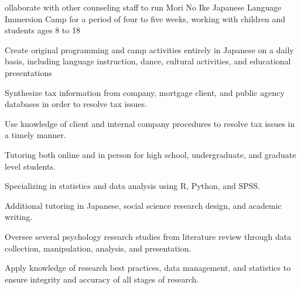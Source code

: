 \documentclass[letterpaper]{deedy-resume_sm} %
\begin{document}
\vspace{\topsep} %
\begin{tightitemize}
\item ollaborate with other counseling staff to run Mori No Ike Japanese Language Immersion Camp for a period of four to five weeks, working with children and students ages 8 to 18
\item Create original programming and camp activities entirely in Japanese on a daily basis, including language instruction, dance, cultural activities, and educational presentations
\end{tightitemize}
\vspace{\topsep} %
\begin{tightitemize}
\item Synthesize tax information from company, mortgage client, and public agency databases in order to resolve tax issues.
\item Use knowledge of client and internal company procedures to resolve tax issues in a timely manner.
\end{tightitemize}
\sectionspace %
\vspace{\topsep} %
\begin{tightitemize}
\item Tutoring both online and in person for high school, undergraduate, and graduate level students.
\item Specializing in statistics and data analysis using R, Python, and SPSS.
\item Additional tutoring in Japanese, social science research design, and academic writing.
\end{tightitemize}
\sectionspace %
\vspace{\topsep} %
\begin{tightitemize}
\item Oversee several psychology research studies from literature review through data collection, manipulation, analysis, and presentation. 
\item Apply knowledge of research best practices, data management, and statistics to ensure integrity and accuracy of all stages of research.
\end{tightitemize}
\end{document}
